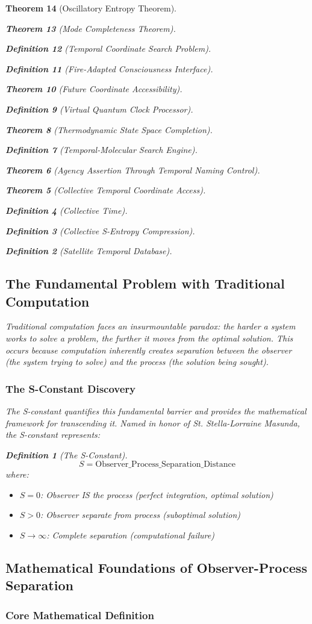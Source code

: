 \documentclass[12pt,a4paper]{article}
\newtheorem{theorem}{Theorem}[section]
\newtheorem{definition}[theorem]{Definition}
\begin{document}
\begin{theorem}[Oscillatory Entropy Theorem]
\begin{theorem}[Mode Completeness Theorem]
\begin{enumerate}
\begin{definition}[Temporal Coordinate Search Problem]
\begin{algorithm}
\begin{definition}[Fire-Adapted Consciousness Interface]
\begin{theorem}[Future Coordinate Accessibility]
\begin{definition}[Virtual Quantum Clock Processor]
\begin{itemize}
\begin{itemize}
\begin{theorem}[Thermodynamic State Space Completion]
\begin{definition}[Temporal-Molecular Search Engine]
\begin{theorem}[Agency Assertion Through Temporal Naming Control]
\begin{remark}
\begin{theorem}[Collective Temporal Coordinate Access]
\begin{definition}[Collective Time]
\begin{definition}[Collective S-Entropy Compression]
\begin{definition}[Satellite Temporal Database]
\begin{algorithm}
\begin{table}[h]
{{\subsection{The Fundamental Problem with Traditional Computation}

Traditional computation faces an insurmountable paradox: the harder a system works to solve a problem, the further it moves from the optimal solution. This occurs because computation inherently creates separation between the observer (the system trying to solve) and the process (the solution being sought).

\subsubsection{The S-Constant Discovery}

The S-constant quantifies this fundamental barrier and provides the mathematical framework for transcending it. Named in honor of St. Stella-Lorraine Masunda, the S-constant represents:

\begin{definition}[The S-Constant]
$$S = \text{Observer\_Process\_Separation\_Distance}$$
where:
\begin{itemize}
\item $S = 0$: Observer IS the process (perfect integration, optimal solution)
\item $S > 0$: Observer separate from process (suboptimal solution)
\item $S \to \infty$: Complete separation (computational failure)
\end{itemize}
\end{definition}

\subsection{Mathematical Foundations of Observer-Process Separation}

\subsubsection{Core Mathematical Definition}

}}
\end{table}
\end{algorithm}
\end{definition}
\end{definition}
\end{definition}
\end{theorem}
\end{remark}
\end{theorem}
\end{definition}
\end{theorem}
\end{itemize}
\end{itemize}
\end{definition}
\end{theorem}
\end{definition}
\end{algorithm}
\end{definition}
\end{enumerate}
\end{theorem}
\end{theorem}
\end{document}
